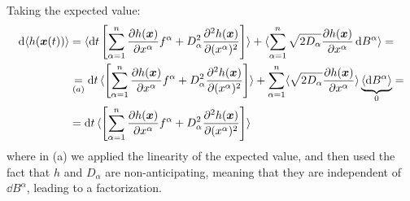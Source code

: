 \documentclass[../template.tex]{subfiles}
\begin{document}
\begin{exo}
\begin{align*}
    \end{align*}
    Taking the expected value:
    \begin{align*}
        \dd{\langle h(\bm{x}(t)) \rangle} &= \langle \dd{t} \left[\sum_{\alpha=1}^n \pdv{h(\bm{x})}{x^\alpha} f^\alpha + D_\alpha^2 \pdv[2]{h(\bm{x})}{(x^\alpha)} \right]  \rangle + \langle  \sum_{\alpha=1}^n \sqrt{2 D_\alpha}\pdv{h(\bm{x})}{x^\alpha} \dd{B^\alpha} \rangle =\\
        &\underset{(a)}{=}  \dd{t} \langle \left[\sum_{\alpha=1}^n \pdv{h(\bm{x})}{x^\alpha} f^\alpha + D_\alpha^2 \pdv[2]{h(\bm{x})}{(x^\alpha)} \right]  \rangle  + \sum_{\alpha=1}^n \langle \sqrt{2 D_\alpha}\pdv{h(\bm{x})}{x^\alpha} \rangle\underbrace{ \langle \dd{B^\alpha} \rangle}_{0} =\\
        &=\dd{t} \langle \left[\sum_{\alpha=1}^n \pdv{h(\bm{x})}{x^\alpha} f^\alpha + D_\alpha^2 \pdv[2]{h(\bm{x})}{(x^\alpha)} \right]  \rangle   
    \end{align*}
where in (a) we applied the linearity of the expected value, and then used the fact that $h$ and $D_\alpha$ are non-anticipating, meaning that they are independent of $\dd{B^\alpha}$, leading to a factorization. 


\end{exo}
\end{document}
